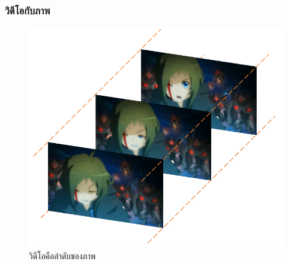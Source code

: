 \documentclass[xcolor=dvipsnames, xetex,serif]{beamer}
\numberwithin{equation}{section}
\begin{document}
    \begin{frame}
    \frametitle{วิดีโอกับภาพ}
        \begin{figure}[H]
            \centering
            \includegraphics[width=0.6\linewidth]{images/anime-frame.png}
            \caption{วิดีโอคือลำดับของภาพ}
        \end{figure}
    \end{frame}
\end{document}
